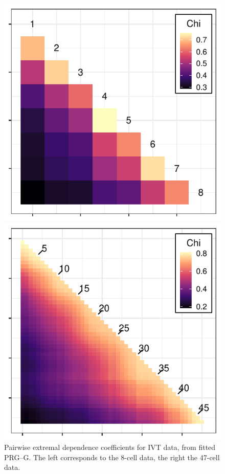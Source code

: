 \begin{figure}[ht!]
    \centering
    \caption{Pairwise extremal dependence coefficients for IVT data, from fitted PRG--G.  
    The left corresponds to the 8-cell data, the right the 47-cell data.\label{fig:chi_ij}}
    \begin{minipage}{.49\textwidth}
      \centering
      \includegraphics[width=0.99\linewidth]{./images/chi_ij_8}
    \end{minipage}
    \begin{minipage}{.49\textwidth}
      \centering
      \includegraphics[width=0.99\linewidth]{./images/chi_ij_46}
    \end{minipage}
\end{figure}

